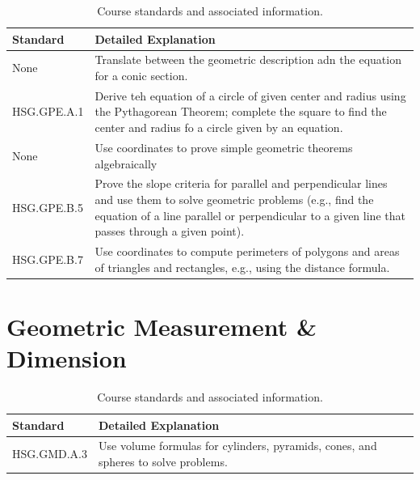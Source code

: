 \documentclass[12pt, oneside]{book}
\begin{document}
\begin{table}[h]
    \centering
    \caption{Course standards and associated information.}
    \vspace{0.3cm} %
    \begin{tabularx}{\textwidth}{l X} %
        \toprule
        \textbf{Standard} & \textbf{Detailed Explanation} \\
        \midrule
        None & Translate between the geometric description adn the equation for a conic section. \\
        HSG.GPE.A.1 & Derive teh equation of a circle of given center and radius using the Pythagorean Theorem; complete the square to find the center and radius fo a circle given by an equation. \\
        None & Use coordinates to prove simple geometric theorems algebraically \\
        HSG.GPE.B.5 & Prove the slope criteria for parallel and perpendicular lines and use them to solve geometric problems (e.g., find the equation of a line parallel or perpendicular to a given line that passes through a given point). \\
        HSG.GPE.B.7 & Use coordinates to compute perimeters of polygons and areas of triangles and rectangles, e.g., using the distance formula. \\
        \bottomrule
    \end{tabularx}
\end{table}

\chapter{Geometric Measurement \& Dimension}

\begin{table}[h]
    \centering
    \caption{Course standards and associated information.}
    \vspace{0.3cm} %
    \begin{tabularx}{\textwidth}{l X} %
        \toprule
        \textbf{Standard} & \textbf{Detailed Explanation} \\
        \midrule
        HSG.GMD.A.3 & Use volume formulas for cylinders, pyramids, cones, and spheres to solve problems. \\
        \bottomrule
    \end{tabularx}
\end{table}
\end{document}
